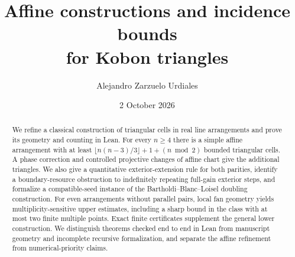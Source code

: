 \documentclass[11pt,a4paper]{article}
\title{Affine constructions and incidence bounds\\for Kobon triangles}
\author{Alejandro Zarzuelo Urdiales}
\date{2 October 2026}
\theoremstyle{definition}
\theoremstyle{remark}
\begin{document}
\maketitle
\begin{abstract}
We refine a classical construction of triangular cells in real line arrangements and prove its geometry and counting in Lean. For every $n\ge4$ there is a simple affine arrangement with at least $\lfloor n(n-3)/3\rfloor+1+(n\bmod2)$ bounded triangular cells. A phase correction and controlled projective changes of affine chart give the additional triangles. We also give a quantitative exterior-extension rule for both parities, identify a boundary-resource obstruction to indefinitely repeating full-gain exterior steps, and formalize a compatible-seed instance of the Bartholdi--Blanc--Loisel doubling construction. For even arrangements without parallel pairs, local fan geometry yields multiplicity-sensitive upper estimates, including a sharp bound in the class with at most two finite multiple points. Exact finite certificates supplement the general lower construction. We distinguish theorems checked end to end in Lean from manuscript geometry and incomplete recursive formalization, and separate the affine refinement from numerical-priority claims.
\end{abstract}







\begingroup
\small
\setlength{\bibsep}{3pt}


\endgroup
\end{document}
